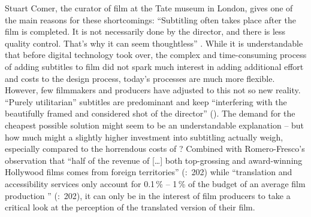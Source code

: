 Stuart Comer, the curator of film at the Tate museum in London, gives one of the main reasons for these shortcomings: “Subtitling often takes place after the film is completed. It is not necessarily done by the director, and there is less quality control. That's why it can seem thoughtless” \citep{rawsthorn2007}. While it is understandable that before digital technology took over, the complex and time-consuming process of adding subtitles to film did not spark much interest in adding additional effort and costs to the design process, today’s processes are much more flexible. However, few filmmakers and producers have adjusted to this not so new reality. “Purely utilitarian” \citep{Vit2005} subtitles are predominant and keep “interfering with the beautifully framed and considered shot of the director” (\citeyear{Vit2005}). The demand for the cheapest possible solution might seem to be an understandable explanation – but how much might a slightly higher investment into subtitling actually weigh, especially compared to the horrendous costs of ? Combined with Romero-Fresco’s observation that “half of the revenue of […] both top-grossing and award-winning Hollywood films comes from foreign territories” (\citealt{romero-fresco2013}:~202) while “translation and accessibility services only account for 0.1\,\% – 1\,\% of the budget of an average film production \citep{Lambourne2012}” (\citeyear{romero-fresco2013}:~202), it can only be in the interest of film producers to take a critical look at the perception of the translated version of their film.

